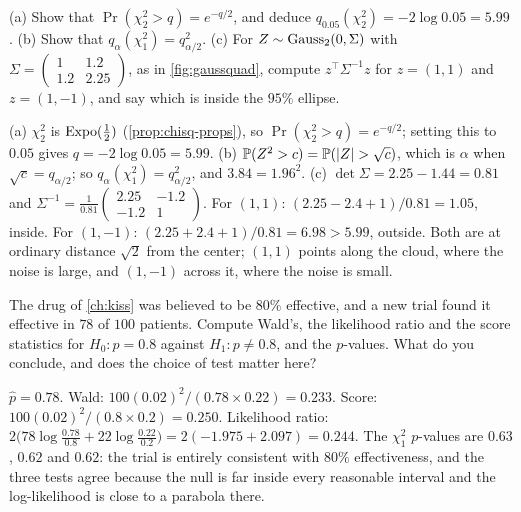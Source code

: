\begin{exercise}
\label{ex:wlr-quadform}
(a) Show that $\Pr(\chi^2_2 > q) = e^{-q/2}$, and deduce $q_{0.05}(\chi^2_2) = -2\log 0.05 = 5.99$. (b) Show that $q_\alpha(\chi^2_1) = q_{\alpha/2}^2$. (c) For $Z \sim \text{Gauss}_2(0, \Sigma)$ with $\Sigma = \begin{pmatrix} 1 & 1.2 \\ 1.2 & 2.25\end{pmatrix}$, as in \cref{fig:gaussquad}, compute $z^\top\Sigma^{-1}z$ for $z = (1, 1)$ and $z = (1, -1)$, and say which is inside the $95\%$ ellipse.
\end{exercise}
\begin{solution}
(a) $\chi^2_2$ is $\text{Expo}(\frac12)$ (\cref{prop:chisq-props}), so $\Pr(\chi^2_2 > q) = e^{-q/2}$; setting this to $0.05$ gives $q = -2\log 0.05 = 5.99$. (b) $\mathbb{P}(Z^2 > c) = \mathbb{P}(\lvert Z\rvert > \sqrt{c})$, which is $\alpha$ when $\sqrt{c} = q_{\alpha/2}$; so $q_\alpha(\chi^2_1) = q_{\alpha/2}^2$, and $3.84 = 1.96^2$. (c) $\det\Sigma = 2.25 - 1.44 = 0.81$ and $\Sigma^{-1} = \frac{1}{0.81}\begin{pmatrix} 2.25 & -1.2 \\ -1.2 & 1\end{pmatrix}$. For $(1, 1)$: $(2.25 - 2.4 + 1)/0.81 = 1.05$, inside. For $(1, -1)$: $(2.25 + 2.4 + 1)/0.81 = 6.98 > 5.99$, outside. Both are at ordinary distance $\sqrt{2}$ from the center; $(1, 1)$ points along the cloud, where the noise is large, and $(1, -1)$ across it, where the noise is small.
\end{solution}

\begin{exercise}
\label{ex:wlr-drug}
The drug of \cref{ch:kiss} was believed to be $80\%$ effective, and a new trial found it effective in $78$ of $100$ patients. Compute Wald's, the likelihood ratio and the score statistics for $H_0: p = 0.8$ against $H_1: p \neq 0.8$, and the $p$-values. What do you conclude, and does the choice of test matter here?
\end{exercise}
\begin{solution}
$\hat{p} = 0.78$. Wald: $100(0.02)^2/(0.78 \times 0.22) = 0.233$. Score: $100(0.02)^2/(0.8 \times 0.2) = 0.250$. Likelihood ratio: $2\big(78\log\frac{0.78}{0.8} + 22\log\frac{0.22}{0.2}\big) = 2(-1.975 + 2.097) = 0.244$. The $\chi^2_1$ $p$-values are $0.63$, $0.62$ and $0.62$: the trial is entirely consistent with $80\%$ effectiveness, and the three tests agree because the null is far inside every reasonable interval and the log-likelihood is close to a parabola there.
\end{solution}

